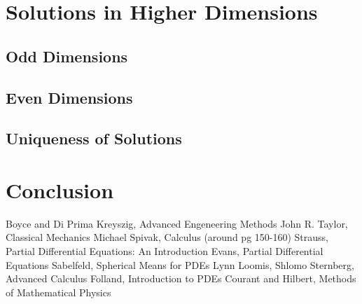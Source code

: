 \documentclass[a4paper, 12pt]{article}
\numberwithin{equation}{section}
\begin{document}
\section{Solutions in Higher Dimensions}

\subsection{Odd Dimensions}
\subsection{Even Dimensions}
\subsection{Uniqueness of Solutions}

\section{Conclusion}

\begin{thebibliography}{alpha}
 Boyce and Di Prima 
 Kreyszig, Advanced Engeneering Methods
 John R. Taylor, Classical Mechanics
 Michael Spivak, Calculus (around pg 150-160)
 Strauss, Partial Differential Equations: An Introduction
 Evans, Partial Differential Equations
 Sabelfeld, Spherical Means for PDEs
 Lynn Loomis, Shlomo Sternberg, Advanced Calculus
 Folland, Introduction to PDEs
 Courant and Hilbert, Methods of Mathematical Physics
\end{thebibliography} 
\end{document}
